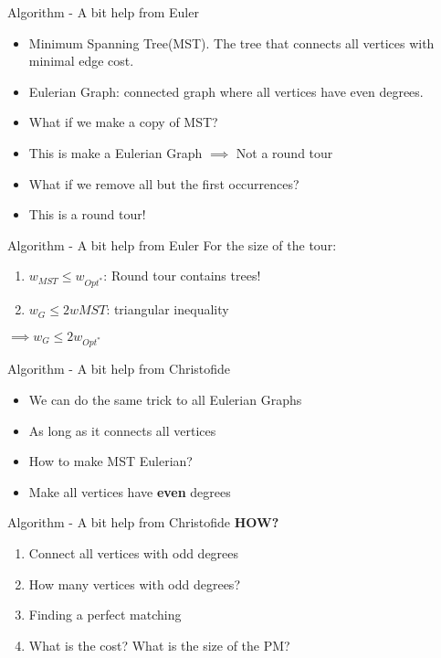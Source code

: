 \documentclass{beamer}
\begin{document}
\begin{frame}{Algorithm - A bit help from Euler}
    \begin{itemize}
        \item<1-2> Minimum Spanning Tree(MST). The tree that connects all vertices with minimal edge cost.
        \item<2> Eulerian Graph: connected graph where all vertices have even degrees.
        \item<3-> What if we make a copy of MST?
        \item<4-> This is make a Eulerian Graph $\implies$ Not a round tour 
        \item<5-> What if we remove all but the first occurrences?
        \item<6-> This is a round tour!
    \end{itemize}
\end{frame}

\begin{frame}{Algorithm - A bit help from Euler}
    For the size of the tour:
    \begin{enumerate}
        \item $w_{MST} \leq w_{Opt^*}$: Round tour contains trees!
        \item $w_G \leq 2w{MST}$: triangular inequality
    \end{enumerate}
    $\implies w_G \leq 2w_{Opt^*}$ 
\end{frame}

\begin{frame}{Algorithm - A bit help from Christofide}
\begin{itemize}
    \item<1-> We can do the same trick to all Eulerian Graphs
    \item<2-> As long as it connects all vertices 
    \item<3-> How to make MST Eulerian?
    \item<4-> Make all vertices have \textbf{even} degrees
\end{itemize}
\end{frame}

\begin{frame}{Algorithm - A bit help from Christofide}
    \textbf{HOW?}
    \begin{enumerate}
        \item<1-> Connect all vertices with odd degrees
        \item<2-> How many vertices with odd degrees?
        \item<3-> Finding a perfect matching
        \item<4-> What is the cost? What is the size of the PM?
    \end{enumerate}
\end{frame}
\end{document}
